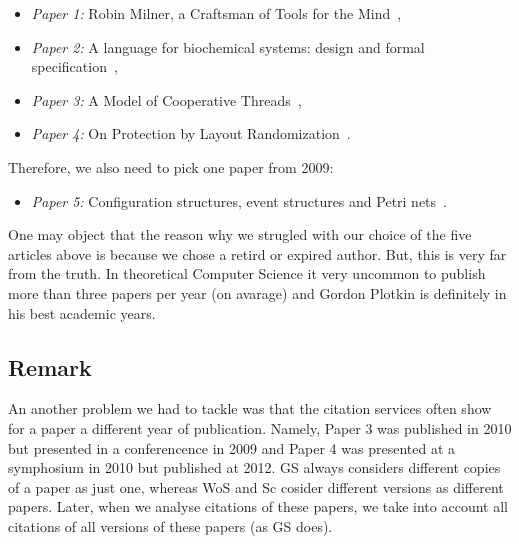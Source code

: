 \documentclass{lmcs}
\begin{document}

\begin{itemize}
\item \emph{Paper 1:} Robin Milner, a Craftsman of Tools for the Mind~\cite{DBLP:conf/lics/Plotkin10},
\item \emph{Paper 2:} A language for biochemical systems: design and formal specification~\cite{DBLP:journals/tcsb/PedersenP10},
\item \emph{Paper 3:} A Model of Cooperative Threads~\cite{DBLP:journals/corr/abs-1009-2405},
\item \emph{Paper 4:} On Protection by Layout Randomization~\cite{DBLP:conf/csfw/AbadiP10}.
\end{itemize}

\noindent
Therefore, we also need to pick one paper from 2009:
\begin{itemize}
\item \emph{Paper 5:} Configuration structures, event structures and Petri nets~\cite{DBLP:journals/corr/abs-0912-4023}.
\end{itemize}

\bigskip

One may object that the reason why we strugled with our choice of the five articles above is because we chose a retird or expired author. But, this is very far from the truth. In theoretical Computer Science it very uncommon to publish more than three papers per year (on avarage) and Gordon Plotkin is definitely  in his best academic years.

\subsection*{Remark}
An another problem we had to tackle was that the citation services often show for a paper a different year of publication. Namely, Paper 3 was published in 2010 but presented in a conferencence in 2009 and Paper 4 was presented at a symphosium in 2010 but published at 2012. GS always considers different copies of a paper as just one, whereas WoS and Sc cosider different versions as different papers. Later, when we analyse citations of these papers, we take into account all citations of all versions of these papers (as GS does).
\end{document}
